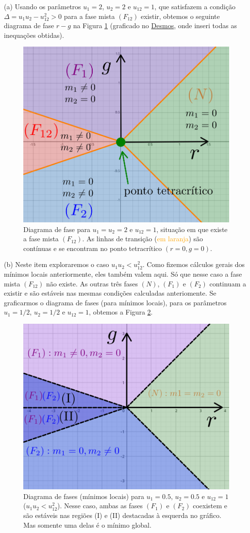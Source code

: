 \documentclass[a4paper,10pt]{article}
\begin{document}
(a) Usando os parâmetros $u_1 = 2$, $u_2 = 2$ e $u_{12} = 1$, que satisfazem a condição $\Delta = u_1 u_2 - u_{12}^2 > 0$ para a fase mista $(F_{12})$ existir, obtemos o seguinte diagrama de fase $r-g$ na Figura \ref{fig:phase_diag-tetra} (graficado no \href{https://www.desmos.com/calculator?lang=pt-BR}{Desmos}, onde inseri todas as inequações obtidas).
\begin{figure}[H]
\centering
\includegraphics[width=0.4\linewidth]{fig/phase_diag-tetra.png}
\caption{Diagrama de fase para $u_1 = u_2 = 2$ e $u_{12} = 1$, situação em que existe a fase mista $(F_{12})$. As linhas de transição (\textcolor{Orange}{em laranja}) são contínuas e se encontram no ponto tetracrítico $(r = 0, g = 0)$.}
\label{fig:phase_diag-tetra}
\end{figure}

\n\n

(b) Neste item exploraremos o caso $u_1 u_2 < u_{12}^2$. Como fizemos cálculos gerais dos mínimos locais anteriormente, eles também valem aqui. Só que nesse caso a fase mista $(F_{12})$ não existe. As outras três fases $(N)$, $(F_1)$ e $(F_2)$ continuam a existir e são estáveis nas mesmas condições calculadas anteriomente. Se graficarmos o diagrama de fases (para mínimos locais), para os parâmetros $u_1 = 1/2$, $u_2 = 1/2$ e $u_{12} = 1$, obtemos a Figura \ref{fig:phase_diag-tri}.
\begin{figure}[H]
\centering
\includegraphics[width=0.4\linewidth]{fig/phase_diag-tri.png}
\caption{Diagrama de fases (mínimos locais) para $u_1 = 0.5$, $u_2 = 0.5$ e $u_{12} = 1$ ($u_1 u_2 < u_{12}^2$). Nesse caso, ambas as fases $(F_1)$ e $(F_2)$ coexistem e são estáveis nas regiões (I) e (II) destacadas à esquerda no gráfico. Mas somente uma delas é o mínimo global.}
\label{fig:phase_diag-tri}
\end{figure}
\end{document}
